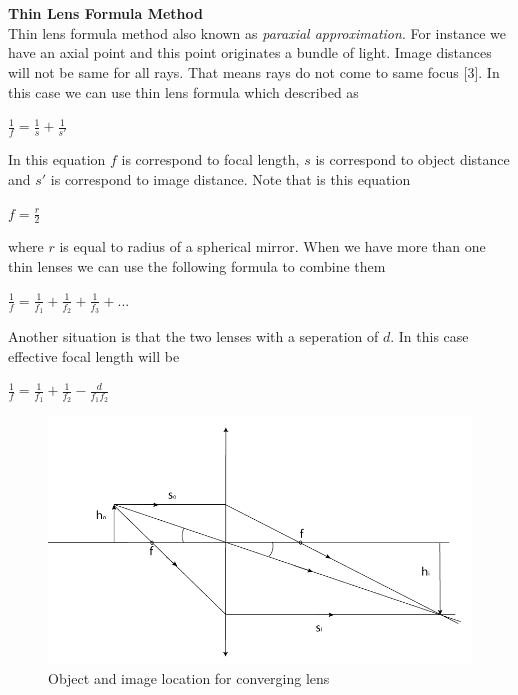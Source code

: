 \documentclass[a4paper,12pt]{report}
\begin{document}
\\\\
\textbf{Thin Lens Formula Method}\\
Thin lens formula method also known as \textit{paraxial approximation}. For instance we have an axial point and this point originates a bundle of light. Image distances will not be same for all rays. That means rays do not come to same focus [3]. In this case we can use thin lens formula which described as
\begin{center}
{\Large 	$\frac{1}{f}=\frac{1}{s}+\frac{1}{s'}$}
\end{center}
In this equation $f$ is correspond to focal length, $s$ is correspond to object distance and $s'$ is correspond to image distance. Note that is this equation
\begin{center}
	{\Large $f=\frac{r}{2}$}
\end{center}
where $r$ is equal to radius of a spherical mirror. When we have more than one thin lenses we can use the following formula to combine them
\begin{center}
{\Large 	$\frac{1}{f}=\frac{1}{f_{1}}+\frac{1}{f_{2}}+\frac{1}{f_{3}}+...$}
\end{center}
Another situation is that the two lenses with a seperation of $d$. In this case effective focal length will be
\begin{center}
	{\Large $\frac{1}{f}=\frac{1}{f_{1}}+\frac{1}{f_{2}}-\frac{d}{f_{1}f_{2}}$}
\end{center}
\begin{figure}[h]
\centering
\includegraphics[width=0.4\linewidth, height=0.12\textheight]{"Convex Lens Formula"}
\caption{Object and image location for converging lens}
\label{fig:ConvexLensFormula}
\end{figure}
\newpage
\end{document}
